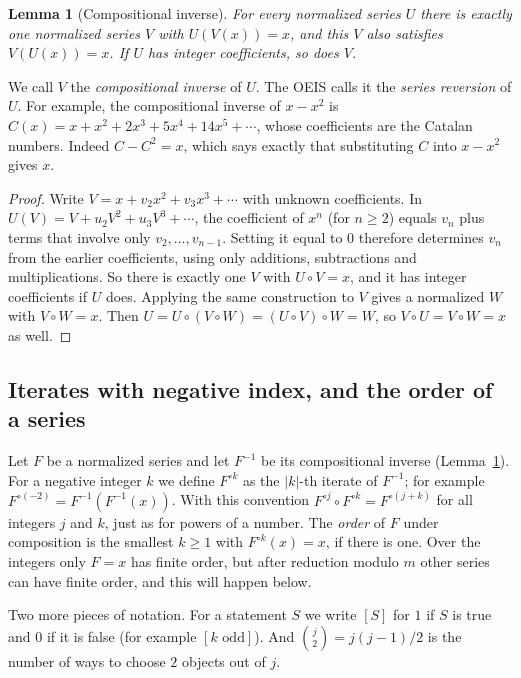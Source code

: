 \documentclass[11pt,a4paper]{article}
\newtheorem{lemma}[theorem]{Lemma}
\theoremstyle{definition}
\theoremstyle{remark}
\begin{document}
\begin{lemma}[Compositional inverse]\label{lem:inverse}
For every normalized series $U$ there is exactly one normalized series $V$ with $U(V(x))=x$, and this $V$ also
satisfies $V(U(x))=x$. If $U$ has integer coefficients, so does $V$.
\end{lemma}

We call $V$ the \emph{compositional inverse} of $U$. The OEIS calls it the \emph{series reversion} of $U$. For example,
the compositional inverse of $x-x^2$ is $C(x)=x+x^2+2x^3+5x^4+14x^5+\cdots$, whose coefficients are the Catalan numbers.
Indeed $C-C^2=x$, which says exactly that substituting $C$ into $x-x^2$ gives $x$.

\begin{proof}
Write $V=x+v_2x^2+v_3x^3+\cdots$ with unknown coefficients. In
$U(V)=V+u_2V^2+u_3V^3+\cdots$, the coefficient of $x^n$ (for $n\ge2$) equals $v_n$ plus terms that involve only
$v_2,\dots,v_{n-1}$. Setting it equal to $0$ therefore determines $v_n$ from the earlier coefficients, using only
additions, subtractions and multiplications. So there is exactly one $V$ with $U\circ V=x$, and it has integer
coefficients if $U$ does. Applying the same construction to $V$ gives a normalized $W$ with $V\circ W=x$. Then
$U=U\circ(V\circ W)=(U\circ V)\circ W=W$, so $V\circ U=V\circ W=x$ as well.
\end{proof}

\subsection{Iterates with negative index, and the order of a series}
Let $F$ be a normalized series and let $F^{-1}$ be its compositional inverse (Lemma~\ref{lem:inverse}). For a
negative integer $k$ we define $F^{\circ k}$ as the $|k|$-th iterate of $F^{-1}$; for example
$F^{\circ(-2)}=F^{-1}(F^{-1}(x))$. With this convention $F^{\circ j}\circ F^{\circ k}=F^{\circ(j+k)}$ for all integers
$j$ and $k$, just as for powers of a number. The \emph{order} of $F$ under composition is the smallest $k\ge1$ with
$F^{\circ k}(x)=x$, if there is one. Over the integers only $F=x$ has finite order, but after reduction modulo $m$
other series can have finite order, and this will happen below.

Two more pieces of notation. For a statement $S$ we write $[S]$ for $1$ if $S$ is true and $0$ if it is false
(for example $[k\text{ odd}]$). And $\binom{j}{2}=j(j-1)/2$ is the number of ways to choose $2$ objects out of $j$.
\end{document}
